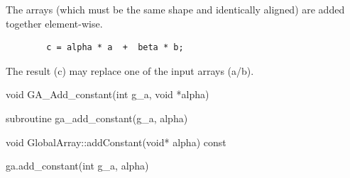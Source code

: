 \documentclass[12pt]{article}
\begin{document}
\gcoll

\begin{desc}

The arrays (which must be the same shape and identically aligned) are added
together element-wise.

\begin{verbatim}
        c = alpha * a  +  beta * b;
\end{verbatim}

The result (c) may replace one of the input arrays (a/b).

\end{desc}


\begin{capi}
\begin{ccode}
void GA_Add_constant(int g_a, void *alpha)
\end{ccode}
\begin{funcargs}
\end{funcargs}
\end{capi}

\begin{fapi}
\begin{fcode}
subroutine ga_add_constant(g_a,  alpha)
\end{fcode}
\begin{funcargs}
\end{funcargs}
\end{fapi}

\begin{cxxapi}
\begin{cxxcode}
void GlobalArray::addConstant(void* alpha) const
\end{cxxcode}
\begin{funcargs}
\end{funcargs}
\end{cxxapi}

\begin{pyapi}
\begin{pycode}
ga.add_constant(int g_a, alpha)
\end{pycode}
\begin{funcargs}
\end{funcargs}
\end{pyapi}
\end{document}

